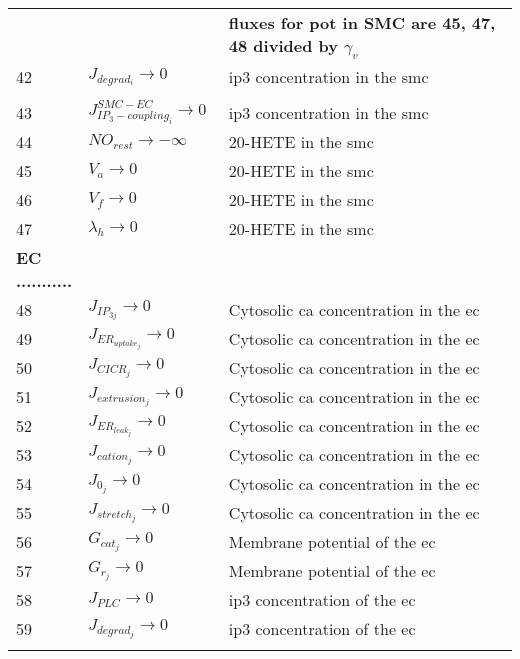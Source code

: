 \documentclass[]{article}
\newcommand{\pot}{\gls{pot}\xspace}
\newcommand{\ca}{\gls{ca}\xspace}
\newcommand{\ip}{\gls{ip3}\xspace}
\begin{document}
\begin{longtable}[h!] { p{0.12\linewidth}  p{0.28\linewidth}     p{0.6\linewidth} }
 &   &  \textbf{fluxes for \pot in SMC are 45, 47, 48 divided by $\gamma_v$} \\
42 &    $ J_{degrad_{i}}\rightarrow 0$ & \ip concentration in the \gls{smc}\\
 &   &  \\
43 &    $ J^{SMC-EC}_{IP_{3}-coupling_{i}}\rightarrow 0$ & \ip concentration in the \gls{smc}\\
44 & $NO_{rest} \rightarrow -\infty $ & 20-HETE in the \gls{smc} \\
45 & $V_a \rightarrow 0$ & 20-HETE in the \gls{smc} \\
46 &    $ V_f\rightarrow 0$ &  20-HETE in the \gls{smc}\\
47 &    $ \lambda_h\rightarrow 0$ & 20-HETE in the \gls{smc} \\
 \textbf{EC ...........}   &  & \\
 48 &    $ J_{IP_{3j}}\rightarrow 0$ & Cytosolic \ca concentration in the \gls{ec} \\
 49 &    $ J_{ER_{uptake_{j}}}\rightarrow 0 $ &  Cytosolic \ca concentration in the \gls{ec}\\
 50 &    $J_{CICR_{j}} \rightarrow 0$ &Cytosolic \ca concentration in the \gls{ec} \\
 51 &    $ J_{extrusion_{j}} \rightarrow 0$ & Cytosolic \ca concentration in the \gls{ec}\\
 52 &    $J_{ER_{leak_{j}}} \rightarrow 0$ &Cytosolic \ca concentration in the \gls{ec} \\
 53 &    $ J_{cation_{j}}\rightarrow 0$ & Cytosolic \ca concentration in the \gls{ec}\\
 54 &    $ J_{0_{j}}\rightarrow 0$ & Cytosolic \ca concentration in the \gls{ec}\\
 55 &    $ J_{stretch_{j}} \rightarrow 0$ &Cytosolic \ca concentration in the \gls{ec} \\
 56 & $G_{cat_j} \rightarrow 0$ &Membrane potential of the \gls{ec} \\
 57 & $ G_{r_j} \rightarrow 0 $ &Membrane potential of the \gls{ec} \\
 58 &    $ J_{PLC}\rightarrow 0$ &\ip concentration of the \gls{ec} \\
 59 &    $ J_{degrad_{j}}  \rightarrow 0$ &\ip concentration of the \gls{ec} \\
	\hline
	\label{tab:table1}
\end{longtable}
\end{document}
